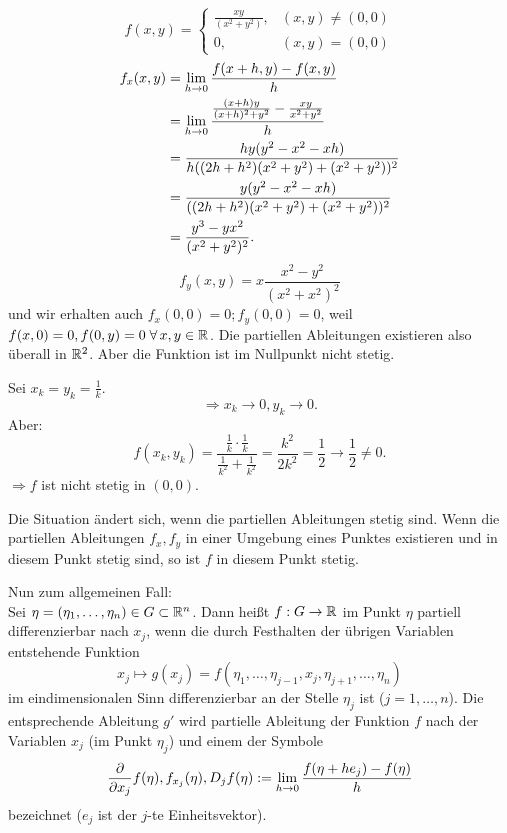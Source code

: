 \documentclass[../ana2u.tex]{subfiles}
\begin{document}
\begin{bsp}
    \[ f(x,y) = \begin{cases}
        \frac{xy}{(x^2+y^2)}, &(x, y) \neq (0,0)\\
        0, &(x,y) = (0,0)
    \end{cases} \]
    \begin{align*}
        f_x(x,y) &= \lim\limits_{h\rightarrow{}0} 
        \frac{f(x+h, y) - f(x,y)}{h} \\
        &= \lim\limits_{h\rightarrow{}0} \frac{ \frac{(x+h)y}{(x+h)^2 + y^2} 
        - \frac{xy}{x^2 + y^2} }{h} \\
        &= \frac{ hy(y^2- x^2 -xh) }{ h((2h+h^2)(x^2+y^2) + (x^2+y^2))^2 } \\
        &= \frac{y(y^2- x^2 -xh)}{((2h+h^2)(x^2+y^2) + (x^2+y^2))^2} \\
        &= \frac{y^3-yx^2}{(x^2+y^2)^2}.
    \end{align*}
    \[ f_y(x,y) = x \frac{x^2 - y^2}{(x^2 + x^2)^2} \]
    und wir erhalten auch \( f_x(0,0) = 0; f_y(0,0) = 0 \),
    weil \(f(x, 0) = 0, \\
    f(0, y) = 0 \; \forall x,y \in \R\). Die partiellen 
    Ableitungen existieren also überall in \( \mathbb{R}^2 \).
    Aber die Funktion ist im Nullpunkt nicht stetig. 

    Sei \( x_k = y_k = \frac{1}{k} \).
    \[ \Rightarrow x_k \rightarrow 0, y_k \rightarrow 0. \]
    Aber:
    \[ f(x_k, y_k) = \frac{ \frac{1}{k} \cdot \frac{1}{k} }{ \frac{1}{k^2} + \frac{1}{k^2} } 
    = \frac{k^2}{2 k^2} = \frac{1}{2} \rightarrow \frac{1}{2} \neq 0. \]
    \( \Rightarrow f \) ist nicht stetig in \((0,0)\).
\end{bsp}
\begin{bem}
Die Situation ändert sich, wenn die partiellen 
Ableitungen stetig sind. Wenn die partiellen 
Ableitungen \(f_x, f_y\) in einer Umgebung 
eines Punktes existieren und in diesem Punkt 
stetig sind, so ist \(f\) in diesem Punkt stetig.
\end{bem}
Nun zum allgemeinen Fall:\\
Sei \( \eta = (\eta_1, \ldots, \eta_n) \in G \subset \mathbb{R}^n \).
Dann heißt \( f:G\rightarrow \mathbb{R} \) im Punkt \( \eta \) 
partiell differenzierbar nach \( x_j \), wenn die 
durch Festhalten der übrigen Variablen 
entstehende Funktion 
\[ x_j \mapsto g(x_j) = f(\eta_1, \ldots, \eta_{j-1}, 
x_j, \eta_{j+1}, \ldots, \eta_n) \]
im eindimensionalen Sinn differenzierbar an 
der Stelle \( \eta_j \) ist (\( j = 1,\ldots, n \)).
Die entsprechende Ableitung \(g'\) wird partielle
Ableitung der Funktion \(f\) nach der Variablen \(x_j\)
(im Punkt \(\eta_j\))
und einem der Symbole 
\[ \frac{\partial}{\partial x_j} f(\eta), 
f_{x_j}(\eta), D_j f(\eta) 
:= \lim\limits_{h\rightarrow{}0} \frac{ f(\eta + h e_j) - f(\eta) }{h} \]
bezeichnet (\(e_j\) ist der \(j\)-te Einheitsvektor).
\end{document}
